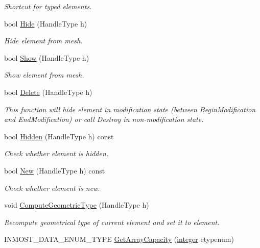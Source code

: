 \begin{DoxyCompactItemize}
\begin{DoxyCompactList}\small\item\em Shortcut for typed elements. \end{DoxyCompactList}\item 
bool \hyperlink{classINMOST_1_1Mesh_a2b3eaaadcd233cf11deba24d1fd64ad1}{Hide} (Handle\-Type h)
\begin{DoxyCompactList}\small\item\em Hide element from mesh. \end{DoxyCompactList}\item 
bool \hyperlink{classINMOST_1_1Mesh_a3bfe7b75e432280922bfa7293743115c}{Show} (Handle\-Type h)
\begin{DoxyCompactList}\small\item\em Show element from mesh. \end{DoxyCompactList}\item 
bool \hyperlink{classINMOST_1_1Mesh_a569c516120df121980d0585deadd3634}{Delete} (Handle\-Type h)
\begin{DoxyCompactList}\small\item\em This function will hide element in modification state (between Begin\-Modification and End\-Modification) or call Destroy in non-\/modification state. \end{DoxyCompactList}\item 
bool \hyperlink{classINMOST_1_1Mesh_a632e8966cbebd2e82df1edc7474a5993}{Hidden} (Handle\-Type h) const 
\begin{DoxyCompactList}\small\item\em Check whether element is hidden. \end{DoxyCompactList}\item 
bool \hyperlink{classINMOST_1_1Mesh_aaa34219e9c94a2509c7bae2254ea7a14}{New} (Handle\-Type h) const 
\begin{DoxyCompactList}\small\item\em Check whether element is new. \end{DoxyCompactList}\item 
void \hyperlink{classINMOST_1_1Mesh_a887f25126d7a0fc38e238e5c2b033d58}{Compute\-Geometric\-Type} (Handle\-Type h)
\begin{DoxyCompactList}\small\item\em Recompute geometrical type of current element and set it to element. \end{DoxyCompactList}\item 
\hypertarget{classINMOST_1_1Mesh_a09727abab2781d3fbbcff23ca064777b}{I\-N\-M\-O\-S\-T\-\_\-\-D\-A\-T\-A\-\_\-\-E\-N\-U\-M\-\_\-\-T\-Y\-P\-E \hyperlink{classINMOST_1_1Mesh_a09727abab2781d3fbbcff23ca064777b}{Get\-Array\-Capacity} (\hyperlink{classINMOST_1_1Storage_aec96942bc647417a801e2895b45964d2}{integer} etypenum)}\label{classINMOST_1_1Mesh_a09727abab2781d3fbbcff23ca064777b}


\end{DoxyCompactItemize}
